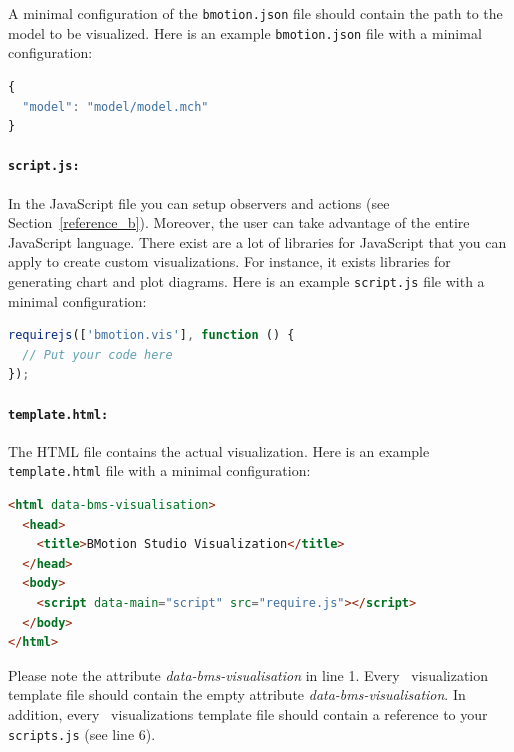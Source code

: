 A minimal configuration of the \texttt{bmotion.json} file should contain the path to the  model to be visualized.
Here is an example \texttt{bmotion.json} file with a minimal configuration:

\begin{lstlisting}[language=JavaScript]
{
  "model": "model/model.mch"
}
\end{lstlisting}


\paragraph{\texttt{script.js:}}
In the JavaScript file you can setup observers and actions (see Section~\ref{reference_b}).
Moreover, the user can take advantage of the entire JavaScript language.
There exist are a lot of libraries for JavaScript that you can apply to create custom visualizations.
For instance, it exists libraries for generating chart and plot diagrams.
Here is an example \texttt{script.js} file with a minimal configuration:

\begin{lstlisting}[language=JavaScript]
requirejs(['bmotion.vis'], function () {
  // Put your code here
});
\end{lstlisting}


\paragraph{\texttt{template.html:}}
The HTML file contains the actual visualization.
Here is an example \texttt{template.html} file with a minimal configuration:

\begin{lstlisting}[language=html]
<html data-bms-visualisation>
  <head>
    <title>BMotion Studio Visualization</title>
  </head>
  <body>
    <script data-main="script" src="require.js"></script>
  </body>
</html>
\end{lstlisting}

Please note the attribute \textit{data-bms-visualisation} in line 1.
Every \bms\ visualization template file should contain the empty attribute \textit{data-bms-visualisation}.
In addition, every \bms\ visualizations template file should contain a reference to your \texttt{scripts.js} (see line 6).

